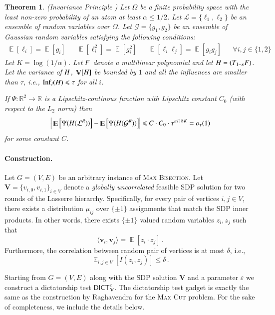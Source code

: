 \documentclass[11pt]{article}
\newtheorem{theorem}{Theorem}[section]
\theoremstyle{definition}
\newcommand{\iprod}[1]{\langle#1\rangle}
\newcommand{\Esymb}{\mathbb{E}}
\newcommand{\Vsymb}{\mathbb{V}}
\DeclareMathOperator*{\E}{\Esymb}
\DeclareMathOperator*{\Var}{\Vsymb}
\newcommand{\sbits}{\{\pm1\}}
\renewcommand{\vec}[1]{{\bm{#1}}}
\newcommand{\mper}{\,.}
\DeclareMathOperator{\Inf}{Inf}
\newcommand{\R}{\mathbb R}
\newcommand{\problemmacro}[1]{\texorpdfstring{\textsc{#1}}{#1}\xspace}
\newcommand{\maxcut}{\problemmacro{Max Cut}}
\newcommand{\maxbisection}{\problemmacro{Max Bisection}}
\renewcommand{\leq}{\leqslant}
\let\epsilon=\varepsilon
\numberwithin{equation}{section}
\newcommand{\eps}{\epsilon}
\let\origparagraph\paragraph
\renewcommand{\paragraph}[1]{\origparagraph{#1.}}
\newcommand{\dict} {\textsf{DICT}}
\newcommand{\erv}[1]{\mathcal{#1}}
\newcommand{\opl}[1]{{\uppercase{#1}}}
\newcommand{\mcl}[1]{\mathcal{#1}}
\begin{document}
\begin{theorem}(Invariance Principle \cite{IsakssonM09}) \label{thm:invariance}
  Let $\Omega$ be a finite probability space with the least non-zero
  probability of an atom at least $\alpha \leq 1/2$.  Let $\mcl{L} =
  \{\ell_1,\ell_2\}$ be an ensemble of random variables
  over $\Omega$.  Let $\erv{G} =
  \{g_1,g_2\}$ be an ensemble of Gaussian random variables satisfying the following conditions:
  \begin{align*}
    \E[\ell_i] = \E[g_i]  & & \E[\ell_i^2] = \E[g_i^2] & & \E[\ell_i
    \ell_j] = \E[g_i g_j] & & \forall i,j \in \{1,2\}
  \end{align*}
  Let $K = \log (1/\alpha)$.  Let $\opl{F}$ denote a
  multilinear polynomial  and let $\opl{H} = (T_{1-\epsilon}
  \opl{F})$.  Let the variance of $\opl{H}$, $\Var[\opl{H}]$ be
  bounded by $1$ and all the influences are smaller than $\tau$, i.e.,  $\Inf_i(\opl{H})
  \leq \tau$ for all $i$.

If $\Psi : \R^2 \rightarrow \R$ is a Lipschitz-continous function with
Lipschitz constant $C_0$ (with respect to the $L_2$ norm)  then
    $$ \Big|\E\Big[\Psi(\opl{H}(\mcl{L}^{R}))\Big] -
    \E\Big[\Psi(\opl{H}(\erv{G}^R))\Big] \Big| \leq
    C \cdot C_0 \cdot \tau^{\epsilon/18K} = o_{\tau}(1) $$
    for some constant $C$.
\end{theorem}


\paragraph{Construction}

	Let $G = (V,E)$ be an arbitrary instance of \maxbisection.  Let
	$\vec{V} = \{v_{i,0},v_{i,1}\}_{i \in V}$ denote a {\it globally
	uncorrelated} feasible SDP solution for two rounds of the
	Lasserre hierarchy.  Specifically, for every pair of vertices
	$i,j \in V$, there exists a distribution $\mu_{ij}$ over $\sbits$ assignments that match the SDP inner
products.  In other words, there exists $\sbits$
valued random variables $z_i,z_j$ such that
$$ \iprod{\vec v_i , \vec v_j} = \E[z_i \cdot z_j] \mper$$
Furthermore, the correlation between random pair of vertices is at
most $\delta$, i.e., $$ \E_{i,j \in V}[I(z_i,z_j)] \leq
\delta \mper$$

	Starting from $G = (V,E)$ along with the SDP solution $\vec{V}$ and a parameter $\epsilon$ we
	construct a dictatorship test $\dict_{\vec{V}}^{\eps}$.  The
	dictatorship test gadget is exactly the same as
	the construction by Raghavendra \cite{Raghavendra08} for the \maxcut
	problem.  For the sake of completeness, we include the details
	below.
\end{document}

